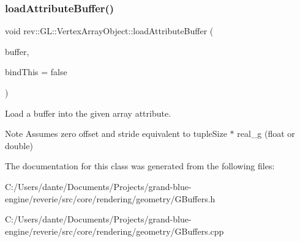 \subsubsection{\texorpdfstring{loadAttributeBuffer()}{loadAttributeBuffer()}}
{\footnotesize\ttfamily void rev\+::\+G\+L\+::\+Vertex\+Array\+Object\+::load\+Attribute\+Buffer (\begin{DoxyParamCaption}\item[{\mbox{\hyperlink{classrev_1_1_g_l_1_1_buffer_object}{Buffer\+Object}} \&}]{buffer,  }\item[{bool}]{bind\+This = {\ttfamily false} }\end{DoxyParamCaption})}



Load a buffer into the given array attribute. 

\begin{DoxyNote}{Note}
Assumes zero offset and stride equivalent to tuple\+Size $\ast$ real\+\_\+g (float or double) 
\end{DoxyNote}


The documentation for this class was generated from the following files\+:\begin{DoxyCompactItemize}
\item 
C\+:/\+Users/dante/\+Documents/\+Projects/grand-\/blue-\/engine/reverie/src/core/rendering/geometry/G\+Buffers.\+h\item 
C\+:/\+Users/dante/\+Documents/\+Projects/grand-\/blue-\/engine/reverie/src/core/rendering/geometry/G\+Buffers.\+cpp\end{DoxyCompactItemize}
